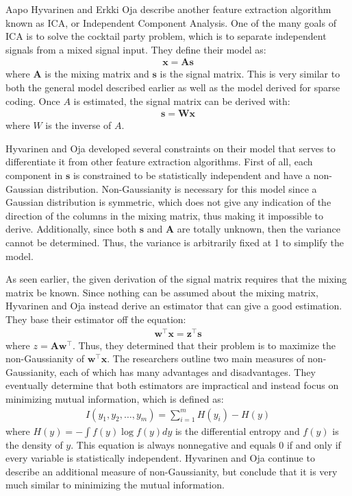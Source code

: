 \documentclass{article}
\newcommand{\vect}[1]{\mathbf{#1}}
\newcommand{\matr}[1]{\mathbf{#1}}
\newcommand{\vx}[0]{\vect{x}}
\newcommand{\vz}[0]{\vect{z}}
\newcommand{\vw}[0]{\vect{w}}
\newcommand{\vs}[0]{\vect{s}}
\newcommand{\mW}[0]{\matr{W}}
\newcommand{\mA}{\matr{A}}
\begin{document}
Aapo Hyvarinen and Erkki Oja describe another feature extraction algorithm known as ICA, or Independent Component Analysis. One of the many goals of ICA is to solve the cocktail party problem, which is to separate independent signals from a mixed signal input. They define their model as:
\begin{align*}
   \vx = \mA \vs
\end{align*}
where $\mA$ is the mixing matrix and $\vs$ is the signal matrix. This is very similar to both the general model described earlier as well as the model derived for sparse coding. Once $A$ is estimated, the signal matrix can be derived with:
\begin{align*}
   \vs = \mW \vx
\end{align*}
where $W$ is the inverse of $A$.

Hyvarinen and Oja developed several constraints on their model that serves to differentiate it from other feature extraction algorithms. First of all, each component in $\vs$ is constrained to be statistically independent and have a non-Gaussian distribution. Non-Gaussianity is necessary for this model since a Gaussian distribution is symmetric, which does not give any indication of the direction of the columns in the mixing matrix, thus making it impossible to derive. Additionally, since both $\vs$ and $\mA$ are totally unknown, then the variance cannot be determined. Thus, the variance is arbitrarily fixed at 1 to simplify the model. 

As seen earlier, the given derivation of the signal matrix requires that the mixing matrix be known. Since nothing can be assumed about the mixing matrix, Hyvarinen and Oja instead derive an estimator that can give a good estimation. They base their estimator off the equation:
\begin{align*}
   \vw^\top \vx = \vz^\top \vs
\end{align*}
where $z = \mA \vw^\top$. Thus, they determined that their problem is to maximize the non-Gaussianity of $\vw^\top \vx$. The researchers outline two main measures of non-Gaussianity, each of which has many advantages and disadvantages. They eventually determine that both estimators are impractical and instead focus on minimizing mutual information, which is defined as:
\begin{align*}
   I(y_1, y_2, \ldots , y_m) = \sum_{i=1}^{m} H(y_i) - H(y)
\end{align*}
where $H(y) = - \int f(y) \log f(y) dy$ is the differential entropy and $f(y)$ is the density of $y$. This equation is always nonnegative and equals 0 if and only if every variable is statistically independent. Hyvarinen and Oja continue to describe an additional measure of non-Gaussianity, but conclude that it is very much similar to minimizing the mutual information.
\end{document}
